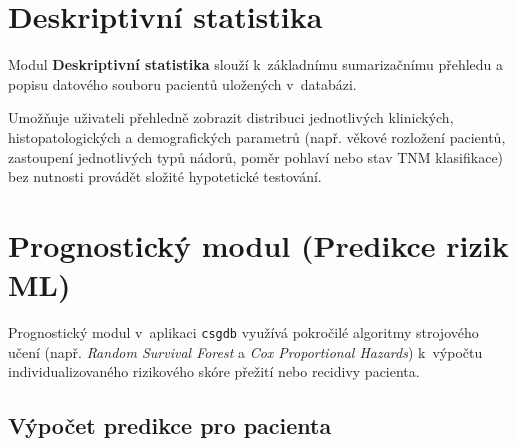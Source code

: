 \documentclass[12pt,a4paper]{article}
\begin{document}
\section{Deskriptivní statistika}

Modul \textbf{Deskriptivní statistika} slouží k~základnímu sumarizačnímu přehledu a popisu datového souboru pacientů uložených v~databázi. 

Umožňuje uživateli přehledně zobrazit distribuci jednotlivých klinických, histopatologických a demografických parametrů (např. věkové rozložení pacientů, zastoupení jednotlivých typů nádorů, poměr pohlaví nebo stav TNM klasifikace) bez nutnosti provádět složité hypotetické testování. 

\section{Prognostický modul (Predikce rizik ML)}

Prognostický modul v~aplikaci \texttt{csgdb} využívá pokročilé algoritmy strojového učení (např. \textit{Random Survival Forest} a \textit{Cox Proportional Hazards}) k~výpočtu individualizovaného rizikového skóre přežití nebo recidivy pacienta.

\subsection{Výpočet predikce pro pacienta}
\end{document}
